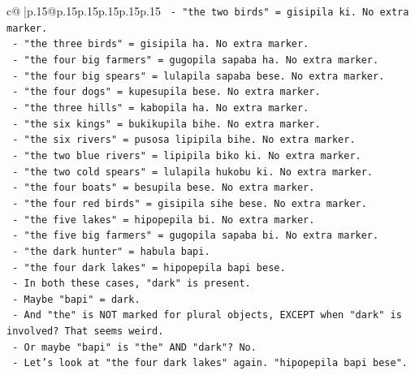 \documentclass{article}
\begin{document}
{\begin{supertabular}{c@{$\;$}|p{.15\linewidth}@{}p{.15\linewidth}p{.15\linewidth}p{.15\linewidth}p{.15\linewidth}p{.15\linewidth}}
{{{\texttt{                  {-} "the two birds" = gisipila ki. No extra marker.} \\
\texttt{                  {-} "the three birds" = gisipila ha. No extra marker.} \\
\texttt{                  {-} "the four big farmers" = gugopila sapaba ha. No extra marker.} \\
\texttt{                  {-} "the four big spears" = lulapila sapaba bese. No extra marker.} \\
\texttt{                  {-} "the four dogs" = kupesupila bese. No extra marker.} \\
\texttt{                  {-} "the three hills" = kabopila ha. No extra marker.} \\
\texttt{                  {-} "the six kings" = bukikupila bihe. No extra marker.} \\
\texttt{                  {-} "the six rivers" = pusosa lipipila bihe. No extra marker.} \\
\texttt{                  {-} "the two blue rivers" = lipipila biko ki. No extra marker.} \\
\texttt{                  {-} "the two cold spears" = lulapila hukobu ki. No extra marker.} \\
\texttt{                  {-} "the four boats" = besupila bese. No extra marker.} \\
\texttt{                  {-} "the four red birds" = gisipila sihe bese. No extra marker.} \\
\texttt{                  {-} "the five lakes" = hipopepila bi. No extra marker.} \\
\texttt{                  {-} "the five big farmers" = gugopila sapaba bi. No extra marker.} \\
\texttt{                  {-} "the dark hunter" = habula bapi.} \\
\texttt{                  {-} "the four dark lakes" = hipopepila bapi bese.} \\
\texttt{                  {-} In both these cases, "dark" is present.} \\
\texttt{                  {-} Maybe "bapi" = dark.} \\
\texttt{                  {-} And "the" is NOT marked for plural objects, EXCEPT when "dark" is involved? That seems weird.} \\
\texttt{                  {-} Or maybe "bapi" is "the" AND "dark"? No.} \\
\texttt{                  {-} Let's look at "the four dark lakes" again. "hipopepila bapi bese".} \\
}}}
\end{supertabular}}
\end{document}
